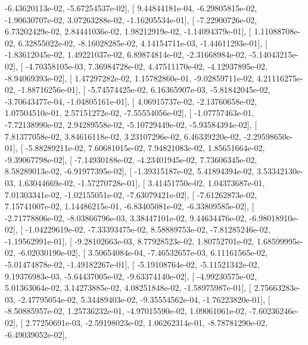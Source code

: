 \documentclass{article}
\begin{document}
         -6.43620113e-02,  -5.67254537e-02],
       [  9.44844181e-04,  -6.29805815e-02,  -1.90630707e-02,
          3.07263288e-02,  -1.16205534e-01],
       [ -7.22900726e-02,   6.73202429e-02,   2.84441036e-02,
          1.98212919e-02,  -1.14094379e-01],
       [  1.11088708e-02,   6.32855022e-02,  -8.16028285e-02,
          4.14154711e-03,  -1.44611293e-01],
       [ -1.83612045e-02,   1.49221037e-02,   6.89874814e-02,
         -2.31668984e-02,  -5.14043215e-02],
       [ -4.70358105e-03,   7.36984728e-02,   4.47511170e-02,
         -4.12937895e-02,  -8.94069393e-02],
       [  1.47297282e-02,   1.15782860e-01,  -9.02859711e-02,
          4.21116275e-02,  -1.88716256e-01],
       [ -5.74574425e-02,   6.16365907e-03,  -5.81842045e-02,
         -3.70643477e-04,  -1.04805161e-01],
       [  4.06915737e-02,  -2.13760658e-02,   1.07504510e-01,
          2.57151272e-02,  -7.55554056e-02],
       [ -1.07757463e-01,  -7.72138990e-02,   2.94289558e-02,
         -5.10729449e-02,  -5.93584394e-02],
       [  7.81377058e-02,   3.84616118e-02,   3.23107296e-02,
          6.46339220e-02,  -2.29598650e-01],
       [ -5.88289211e-02,   7.60681015e-02,   7.94821083e-02,
          1.85651664e-02,  -9.39067798e-02],
       [ -7.14930188e-02,  -4.23401945e-02,   7.73606345e-02,
          8.58289013e-02,  -6.91977395e-02],
       [ -1.39315187e-02,   5.41894394e-02,   3.53342130e-03,
          1.63044669e-02,  -1.57270728e-01],
       [  3.41451750e-02,   1.04373687e-01,   7.01303341e-02,
         -1.02155051e-02,  -7.63079421e-02],
       [ -7.61262873e-02,   7.15741007e-02,   1.14486215e-01,
         -6.83405081e-02,  -6.33809585e-02],
       [ -2.71778806e-02,  -8.03866796e-03,   3.38447101e-02,
          9.44634476e-02,  -6.98018910e-02],
       [ -1.04229619e-02,  -7.33393475e-02,   8.58889753e-02,
         -7.81285246e-02,  -1.19562991e-01],
       [ -9.28102663e-03,   8.77928523e-02,   1.80752701e-02,
          1.68599995e-02,  -6.02030190e-02],
       [  3.50654084e-04,  -7.46532657e-03,   6.11161565e-02,
         -5.01474878e-02,  -1.49182267e-01],
       [ -5.19108764e-02,  -5.11521342e-02,   9.19376983e-03,
         -5.64437005e-02,  -9.63374140e-02],
       [ -4.99230575e-02,   5.01363064e-02,   3.14273885e-02,
          4.08251848e-02,  -1.58975987e-01],
       [  2.75663283e-03,  -2.47795054e-02,   5.34489403e-02,
         -9.35554562e-04,  -1.76223820e-01],
       [ -8.50885957e-02,   1.25736232e-01,  -4.97015590e-02,
          1.09061061e-02,  -7.60236246e-02],
       [  2.77250691e-03,  -2.59198023e-02,   1.06262314e-01,
         -8.78781290e-02,  -6.49039052e-02],
\end{document}
